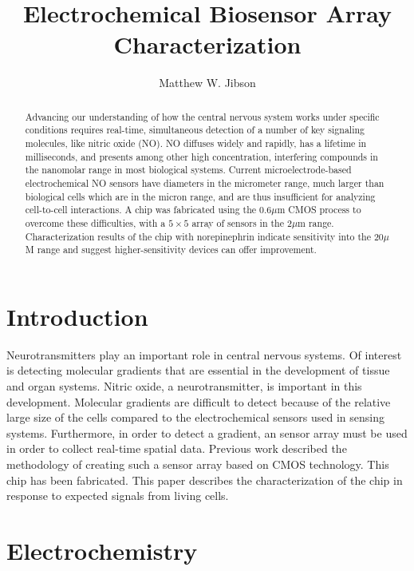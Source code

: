 \documentclass{article}
\begin{document}
\title{Electrochemical Biosensor Array Characterization}
\author{Matthew W. Jibson}

\maketitle{}

\begin{abstract}

Advancing our understanding of how the central nervous system works under specific conditions requires real-time, simultaneous detection of a number of key signaling molecules, like nitric oxide (NO). NO diffuses widely and rapidly, has a lifetime in milliseconds, and presents among other high concentration, interfering compounds in the nanomolar range in most biological systems. Current microelectrode-based electrochemical NO sensors have diameters in the micrometer range, much larger than biological cells which are in the micron range, and are thus insufficient for analyzing cell-to-cell interactions. A chip was fabricated using the 0.6$\mu$m CMOS process to overcome these difficulties, with a $5 \times 5$ array of sensors in the 2$\mu$m range. Characterization results of the chip with norepinephrin indicate sensitivity into the 20$\mu$M range and suggest higher-sensitivity devices can offer improvement.

\end{abstract}

\section{Introduction}

Neurotransmitters play an important role in central nervous systems. Of interest is detecting molecular gradients that are essential in the development of tissue and organ systems. Nitric oxide, a neurotransmitter, is important in this development. Molecular gradients are difficult to detect because of the relative large size of the cells compared to the electrochemical sensors used in sensing systems. Furthermore, in order to detect a gradient, an sensor array must be used in order to collect real-time spatial data. Previous work described the methodology of creating such a sensor array based on CMOS technology. This chip has been fabricated. This paper describes the characterization of the chip in response to expected signals from living cells.

\section{Electrochemistry}
\end{document}
